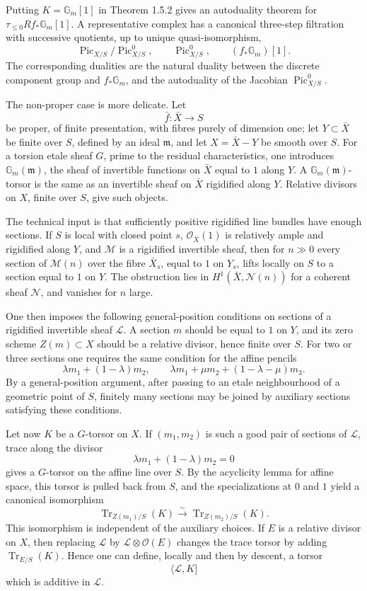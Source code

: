 \documentclass[12pt]{article}
\newcommand{\Ll}{\mathcal L}
\newcommand{\Mm}{\mathcal M}
\newcommand{\Ocal}{\mathcal O}
\newcommand{\Nn}{\mathcal N}
\begin{document}
Putting \(K=\mathbb G_m[1]\) in Theorem 1.5.2 gives an autoduality theorem for \(\tau_{\leq0}Rf_*\mathbb G_m[1]\). A representative complex has a canonical three-step filtration with successive quotients, up to unique quasi-isomorphism,
\[
\operatorname{Pic}_{X/S}/\operatorname{Pic}^0_{X/S},
\qquad
\operatorname{Pic}^0_{X/S},
\qquad
(f_*\mathbb G_m)[1].
\]
The corresponding dualities are the natural duality between the discrete component group and \(f_*\mathbb G_m\), and the autoduality of the Jacobian \(\operatorname{Pic}^0_{X/S}\).

The non-proper case is more delicate. Let
\[
\bar f:\bar X\to S
\]
be proper, of finite presentation, with fibres purely of dimension one; let \(Y\subset\bar X\) be finite over \(S\), defined by an ideal \(\mathfrak m\), and let \(X=\bar X-Y\) be smooth over \(S\). For a torsion etale sheaf \(G\), prime to the residual characteristics, one introduces \(\mathbb G_m(\mathfrak m)\), the sheaf of invertible functions on \(\bar X\) equal to \(1\) along \(Y\). A \(\mathbb G_m(\mathfrak m)\)-torsor is the same as an invertible sheaf on \(\bar X\) rigidified along \(Y\). Relative divisors on \(X\), finite over \(S\), give such objects.

The technical input is that sufficiently positive rigidified line bundles have enough sections. If \(S\) is local with closed point \(s\), \(\Ocal_{\bar X}(1)\) is relatively ample and rigidified along \(Y\), and \(\Mm\) is a rigidified invertible sheaf, then for \(n\gg0\) every section of \(\Mm(n)\) over the fibre \(\bar X_s\), equal to \(1\) on \(Y_s\), lifts locally on \(S\) to a section equal to \(1\) on \(Y\). The obstruction lies in \(H^1(\bar X,\Nn(n))\) for a coherent sheaf \(\Nn\), and vanishes for \(n\) large.

One then imposes the following general-position conditions on sections of a rigidified invertible sheaf \(\Ll\). A section \(m\) should be equal to \(1\) on \(Y\), and its zero scheme \(Z(m)\subset X\) should be a relative divisor, hence finite over \(S\). For two or three sections one requires the same condition for the affine pencils
\[
\lambda m_1+(1-\lambda)m_2,
\qquad
\lambda m_1+\mu m_2+(1-\lambda-\mu)m_3.
\]
By a general-position argument, after passing to an etale neighbourhood of a geometric point of \(S\), finitely many sections may be joined by auxiliary sections satisfying these conditions.

Let now \(K\) be a \(G\)-torsor on \(X\). If \((m_1,m_2)\) is such a good pair of sections of \(\Ll\), trace along the divisor
\[
\lambda m_1+(1-\lambda)m_2=0
\]
gives a \(G\)-torsor on the affine line over \(S\). By the acyclicity lemma for affine space, this torsor is pulled back from \(S\), and the specializations at \(0\) and \(1\) yield a canonical isomorphism
\[
\operatorname{Tr}_{Z(m_1)/S}(K)
\xrightarrow{\sim}
\operatorname{Tr}_{Z(m_2)/S}(K).
\tag{1.5.12.1}
\]
This isomorphism is independent of the auxiliary choices. If \(E\) is a relative divisor on \(X\), then replacing \(\Ll\) by \(\Ll\otimes\Ocal(E)\) changes the trace torsor by adding \(\operatorname{Tr}_{E/S}(K)\). Hence one can define, locally and then by descent, a torsor
\[
\langle\Ll,K]
\]
which is additive in \(\Ll\).
\end{document}
